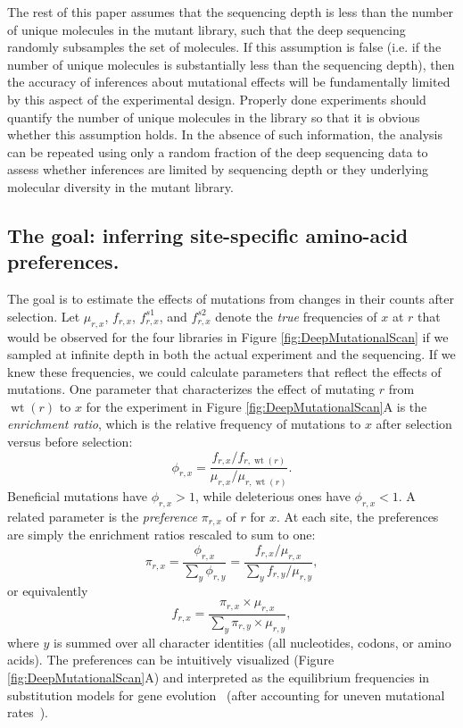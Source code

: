 \documentclass[twocolumn]{bmcart}%
\begin{document}
The rest of this paper assumes that the sequencing depth is less than the number of unique molecules in the mutant library, such that the deep sequencing randomly subsamples the set of molecules. If this assumption is false (i.e. if the number of unique molecules is substantially less than the sequencing depth), then the accuracy of inferences about mutational effects will be fundamentally limited by this aspect of the experimental design. Properly done experiments should quantify the number of unique molecules in the library so that it is obvious whether this assumption holds. In the absence of such information, the analysis can be repeated using only a random fraction of the deep sequencing data to assess whether inferences are limited by sequencing depth or they underlying molecular diversity in the mutant library.

\subsection*{The goal: inferring site-specific amino-acid preferences.}
The goal is to estimate the effects of mutations from changes in their counts after selection. Let $\mu_{r,x}$, $f_{r,x}$, $f_{r,x}^{s1}$, and $f_{r,x}^{s2}$ denote the \emph{true} frequencies of $x$ at $r$ that would be observed for the four libraries in Figure \ref{fig:DeepMutationalScan} if we sampled at infinite depth in both the actual experiment and the sequencing. If we knew these frequencies, we could calculate parameters that reflect the effects of mutations. One parameter that characterizes the effect of mutating $r$ from $\operatorname{wt}\left(r\right)$ to $x$ for the experiment in Figure \ref{fig:DeepMutationalScan}A is the \emph{enrichment ratio}, which is the relative frequency of mutations to $x$ after selection versus before selection:
\begin{equation}
\label{eq:enrichment}
\phi_{r,x} = \frac{f_{r,x} / f_{r,\operatorname{wt}\left(r\right)}}{\mu_{r,x} / \mu_{r,\operatorname{wt}\left(r\right)}}.
\end{equation}
Beneficial mutations have $\phi_{r,x} > 1$, while deleterious ones have $\phi_{r,x} < 1$. A related parameter is the \emph{preference} $\pi_{r,x}$ of $r$ for $x$. At each site, the preferences are simply the enrichment ratios rescaled to sum to one:
\begin{equation}
\label{eq:preference}
\pi_{r,x} = \frac{\phi_{r,x}}{\sum_y \phi_{r,y}} = \frac{f_{r,x} / \mu_{r,x}}{\sum_y f_{r,y} / \mu_{r,y}},
\end{equation}
or equivalently
\begin{equation}
\label{eq:preference2}
f_{r,x} = \frac{\pi_{r,x} \times \mu_{r,x}}{\sum_y \pi_{r,y} \times \mu_{r,y}},
\end{equation}
where $y$ is summed over all character identities (all nucleotides, codons, or amino acids).
The preferences can be intuitively visualized (Figure \ref{fig:DeepMutationalScan}A) and interpreted as the equilibrium frequencies in substitution models for gene evolution~\cite{bloom2014experimentally,bloom2014informed} (after accounting for uneven mutational rates~\cite{yampolsky2005exchangeability,stoltzfus2009climbing}). 
\end{document}

